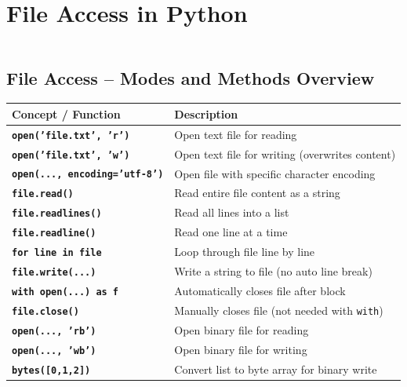 \documentclass[a4paper,11pt]{article}
\begin{document}
	\newpage
	
	\section{File Access in Python}
	\inputminted{python}{Python_Files/file_access_guid.py}


	\vspace{1em}
	
	\subsection*{File Access – Modes and Methods Overview}
	\renewcommand{\arraystretch}{1.5}
	\begin{tabular}{>{\bfseries}p{4cm} p{9cm}}
		\toprule
		Concept / Function & Description \\
		\midrule
		\texttt{open('file.txt', 'r')} & Open text file for reading \\
		\texttt{open('file.txt', 'w')} & Open text file for writing (overwrites content) \\
		\texttt{open(..., encoding='utf-8')} & Open file with specific character encoding \\
		\texttt{file.read()} & Read entire file content as a string \\
		\texttt{file.readlines()} & Read all lines into a list \\
		\texttt{file.readline()} & Read one line at a time \\
		\texttt{for line in file} & Loop through file line by line \\
		\texttt{file.write(...)} & Write a string to file (no auto line break) \\
		\texttt{with open(...) as f} & Automatically closes file after block \\
		\texttt{file.close()} & Manually closes file (not needed with \texttt{with}) \\
		\texttt{open(..., 'rb')} & Open binary file for reading \\
		\texttt{open(..., 'wb')} & Open binary file for writing \\
		\texttt{bytes([0,1,2])} & Convert list to byte array for binary write \\
		\bottomrule
	\end{tabular}
	
	\newpage
	
		\inputminted{python}{Python_Files/file_modes_explained.py}
		
\end{document}
